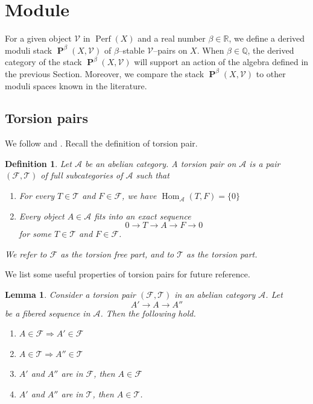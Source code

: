 \documentclass[11pt]{article}
\newtheorem{definition}{Definition}
\newtheorem{lemma}[theorem]{Lemma}
\newcommand{\BR}{\mathbb{R}}
\newcommand{\BQ}{\mathbb{Q}}
\newcommand{\perf}{\operatorname{Perf}(X)}
\newcommand{\framing}{\mathcal{V}}
\newcommand{\pairs}{\boldsymbol{\operatorname{P}}^{\beta}(X,\mathcal{V})}
\begin{document}
\section{Module}
For a given object $\framing$ in $\perf$ and a real number $\beta\in \BR$, we define a derived moduli stack $\pairs$ of $\beta$--stable $\framing$--pairs on $X$. When $\beta \in \BQ$, the derived category of the stack $\pairs$ will support an action of the algebra defined in the previous Section. Moreover, we compare the stack $\pairs$ to other moduli spaces known in the literature.

\subsection{Torsion pairs}
We follow \cite{Bayer_2021} and \cite{Rota_2021}. Recall the definition of torsion pair.

\begin{definition}\label{def : torsionpair}
    Let $\mathcal{A}$ be an abelian category. A \textit{torsion pair} on $\mathcal{A}$ is a pair $(\mathcal{F},\mathcal{T})$ of full subcategories of $\mathcal{A}$ such that
    \begin{enumerate}
        \item For every $T \in \mathcal{T}$ and $F\in \mathcal{F}$, we have $\operatorname{Hom}_{\mathcal{A}}(T,F) =\{0\}$
        \item Every object $A\in \mathcal{A}$ fits into an exact sequence
        $$
         0\rightarrow T \rightarrow A \rightarrow F \rightarrow 0
        $$
        for some $T \in \mathcal{T}$ and $F\in \mathcal{F}$.
    \end{enumerate}
    We refer to $\mathcal{F}$ as the\textit{ torsion free} part, and to $\mathcal{T}$ as the \textit{torsion part}.
\end{definition}

\noindent We list some useful properties of torsion pairs for future reference.

\begin{lemma}\label{lemma : torsionproperties}
    Consider a torsion pair $(\mathcal{F},\mathcal{T})$ in an abelian category $\mathcal{A}$. Let
    $$
        A' \rightarrow A \rightarrow A'' 
    $$
    be a fibered sequence in $\mathcal{A}$. Then the following hold.
    
    \begin{enumerate}
        \item $A\in \mathcal{F} \Rightarrow A'\in \mathcal{F}$
        \item $A\in \mathcal{T} \Rightarrow A''\in \mathcal{T}$
        \item $A'$ and $A''$ are in $\mathcal{F} $, then $A \in \mathcal{F}$
        \item $A'$ and $A''$ are in $\mathcal{T} $, then $A \in \mathcal{T}$.
    \end{enumerate}
\end{lemma}
\end{document}
